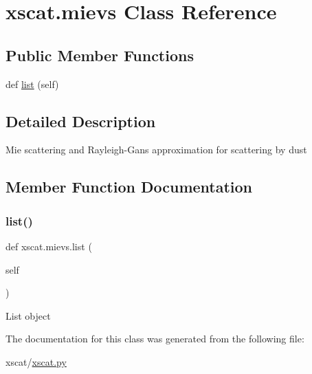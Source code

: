 \hypertarget{classxscat_1_1mievs}{}\section{xscat.\+mievs Class Reference}
\label{classxscat_1_1mievs}
\subsection*{Public Member Functions}
\begin{DoxyCompactItemize}
\item 
def \hyperlink{classxscat_1_1mievs_ac3087e95291646eeafe13062f1cb1044}{list} (self)
\end{DoxyCompactItemize}


\subsection{Detailed Description}
\begin{DoxyVerb}Mie scattering and Rayleigh-Gans approximation for scattering by dust
\end{DoxyVerb}
 

\subsection{Member Function Documentation}
\mbox{\label{classxscat_1_1mievs_ac3087e95291646eeafe13062f1cb1044}} 
\subsubsection{\texorpdfstring{list()}{list()}}
{\footnotesize\ttfamily def xscat.\+mievs.\+list (\begin{DoxyParamCaption}\item[{}]{self }\end{DoxyParamCaption})}

\begin{DoxyVerb}List object\end{DoxyVerb}
 

The documentation for this class was generated from the following file\+:\begin{DoxyCompactItemize}
\item 
xscat/\hyperlink{xscat_8py}{xscat.\+py}\end{DoxyCompactItemize}
